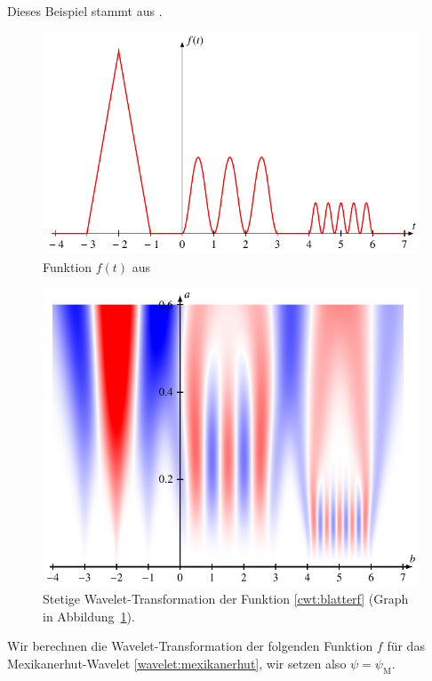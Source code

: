 \begin{beispiel}
Dieses Beispiel stammt aus \cite[p.~60]{buch:blatter}.
\begin{figure}
\centering
\includegraphics{chapters/4-cwt/images/f.pdf}
\caption{Funktion $f(t)$ aus \cite[p.~60]{buch:blatter}
\label{cwt:blatterfgraph}}
\end{figure}
\begin{figure}
\centering
\includegraphics{chapters/4-cwt/images/notes.pdf}
\caption{Stetige Wavelet-Transformation der Funktion \eqref{cwt:blatterf}
(Graph in Abbildung~\ref{cwt:blatterfgraph}).
\label{cwt:blattercwt}}
\end{figure}
Wir berechnen die Wavelet-Transformation der folgenden Funktion $f$
für das Mexikanerhut-Wavelet \eqref{wavelet:mexikanerhut}, wir setzen also
$\psi=\psi_\text{M}$.
\begin{equation}

\end{equation}
\end{beispiel}
